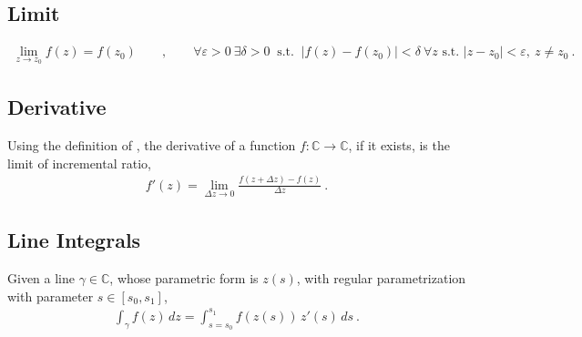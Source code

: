 \documentclass[letterpaper,10pt,english]{jupyterBook}
\begin{document}
\subsection{Limit}
\label{\detokenize{ch/complex/analysis:limit}}\label{\detokenize{ch/complex/analysis:complex-analysis-fun-limit}}\begin{equation*}
\begin{split}\lim_{z \rightarrow z_0} f(z) = f(z_0) \qquad , \qquad \forall \varepsilon > 0 \ \exists \delta > 0 \ \text{ s.t. } \  |f(z) - f(z_0)| < \delta \ \forall z \text{ s.t. } |z - z_0| < \varepsilon, \ z \ne z_0 \ .\end{split}
\end{equation*}

\subsection{Derivative}
\label{\detokenize{ch/complex/analysis:derivative}}\label{\detokenize{ch/complex/analysis:complex-analysis-fun-derivative}}
\sphinxAtStartPar
Using the definition of {\hyperref[\detokenize{ch/complex/analysis:complex-analysis-fun-derivative}]{}}, the derivative of a function \(f: \mathbb{C} \rightarrow \mathbb{C}\), if it exists, is the limit of incremental ratio,
\begin{equation*}
\begin{split}f'(z) = \lim_{\Delta z \rightarrow 0} \frac{f(z + \Delta z) - f(z)}{\Delta z} \ .\end{split}
\end{equation*}

\subsection{Line Integrals}
\label{\detokenize{ch/complex/analysis:line-integrals}}\label{\detokenize{ch/complex/analysis:complex-analysis-fun-line-integral}}
\sphinxAtStartPar
Given a line \(\gamma \in \mathbb{C}\), whose parametric form is \(z(s)\), with regular parametrization with parameter \(s \in [s_0, s_1]\),
\begin{equation*}
\begin{split}\int_{\gamma} f(z) \, dz = \int_{s=s_0}^{s_1} f(z(s)) \, z'(s) \, ds \ .\end{split}
\end{equation*}
\end{document}
